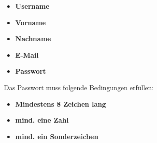 \begin{figure}[H]
\begin{minipage}{.6\textwidth}
\begin{changemargin}{0.5cm}{0cm}
            \begin{itemize}
                \item \textbf{Username}
                \item \textbf{Vorname}
                \item \textbf{Nachname}
                \item \textbf{E-Mail}
                \item \textbf{Passwort}
            \end{itemize}

            Das Passwort muss folgende Bedingungen erfüllen:
            \begin{itemize}
                \item \textbf{Mindestens 8 Zeichen lang}
                \item \textbf{mind. eine Zahl}
                \item \textbf{mind. ein Sonderzeichen}
            \end{itemize}
        \end{changemargin}
    \end{minipage}
\end{figure}

